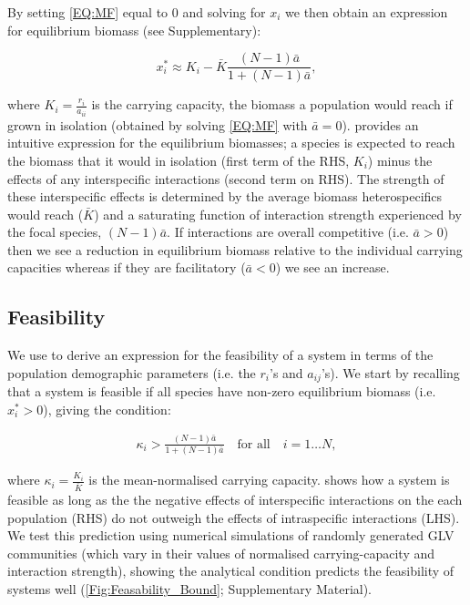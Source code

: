 \documentclass{article}
\begin{document}
By setting \cref{EQ:MF} equal to $0$ and solving for $x_i$ we then obtain an expression for equilibrium biomass (see Supplementary):

\begin{equation}\label{EQ:MF_eqi}
  x^*_i \approx K_i -  \bar{K}  \frac{ (N-1)\bar{a}}{1 + (N-1)\bar{a}}, 
\end{equation}

where $K_i = \frac{r_i}{a_{ii}}$ is the carrying capacity, the biomass a population would reach if grown in isolation (obtained by solving \cref{EQ:MF} with $\bar{a} = 0$).  provides an intuitive expression for the equilibrium biomasses; a species is expected to reach the biomass that it would in isolation (first term of the RHS, $K_i$) minus the effects of any interspecific interactions (second term on RHS). The strength of these interspecific effects is determined by the average biomass heterospecifics would reach ($\bar{K}$) and a saturating function of interaction strength experienced by the focal species, $(N-1)\bar{a}$. If interactions are overall competitive (i.e. $ \bar{a} > 0$) then we see a reduction in equilibrium biomass relative to the individual carrying capacities whereas if they are facilitatory ($ \bar{a} < 0$) we see an increase.  

\subsection{Feasibility} \label{Sec:Feasibility}
We use  to derive an expression for the feasibility of a system in terms of the population demographic parameters (i.e. the $r_i$'s and $a_{ij}$'s). We start by recalling that a system is feasible if all species have non-zero equilibrium biomass (i.e. $x_i^* > 0 $), giving the condition:

\begin{align} \label{EQ:Feas_sp}
  \kappa_i > \frac{(N-1)\bar{a}}{1 + (N-1)\bar{a}} \quad \text{for all} \quad i = 1 \ldots N,
\end{align}

where $\kappa_i = \frac{K_i}{\bar{K}}$ is the mean-normalised carrying capacity.  shows how a system is feasible as long as the the negative effects of interspecific interactions on the each population (RHS) do not outweigh the effects of intraspecific interactions (LHS). We test this prediction using numerical simulations of randomly generated GLV communities (which vary in their values of normalised carrying-capacity and interaction strength), showing the analytical condition predicts the feasibility of systems well (\cref{Fig:Feasability_Bound}; Supplementary Material). 
\end{document}
